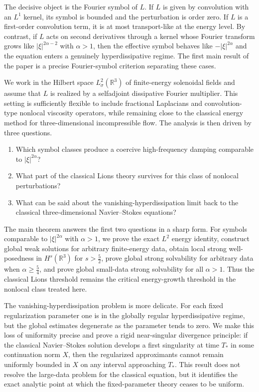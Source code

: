 \documentclass[11pt]{article}
\theoremstyle{definition}
\theoremstyle{remark}
\newcommand{\R}{\mathbb{R}}
\begin{document}
The decisive object is the Fourier symbol of $L$. If $L$ is given by convolution with an $L^1$ kernel, its symbol is bounded and the perturbation is order zero. If $L$ is a first-order convolution term, it is at most transport-like at the energy level. By contrast, if $L$ acts on second derivatives through a kernel whose Fourier transform grows like $|\xi|^{2\alpha-2}$ with $\alpha>1$, then the effective symbol behaves like $-|\xi|^{2\alpha}$ and the equation enters a genuinely hyperdissipative regime. The first main result of the paper is a precise Fourier-symbol criterion separating these cases.

We work in the Hilbert space $L^2_\sigma(\R^3)$ of finite-energy solenoidal fields and assume that $L$ is realized by a selfadjoint dissipative Fourier multiplier. This setting is sufficiently flexible to include fractional Laplacians and convolution-type nonlocal viscosity operators, while remaining close to the classical energy method for three-dimensional incompressible flow. The analysis is then driven by three questions.

\begin{enumerate}[label=(\roman*)]
\item Which symbol classes produce a coercive high-frequency damping comparable to $|\xi|^{2\alpha}$?
\item What part of the classical Lions theory survives for this class of nonlocal perturbations?
\item What can be said about the vanishing-hyperdissipation limit back to the classical three-dimensional Navier--Stokes equations?
\end{enumerate}

The main theorem answers the first two questions in a sharp form. For symbols comparable to $|\xi|^{2\alpha}$ with $\alpha>1$, we prove the exact $L^2$ energy identity, construct global weak solutions for arbitrary finite-energy data, obtain local strong well-posedness in $H^s(\R^3)$ for $s>\frac52$, prove global strong solvability for arbitrary data when $\alpha\ge\frac54$, and prove global small-data strong solvability for all $\alpha>1$. Thus the classical Lions threshold remains the critical energy-growth threshold in the nonlocal class treated here.

The vanishing-hyperdissipation problem is more delicate. For each fixed regularization parameter one is in the globally regular hyperdissipative regime, but the global estimates degenerate as the parameter tends to zero. We make this loss of uniformity precise and prove a rigid near-singular divergence principle: if the classical Navier--Stokes solution develops a first singularity at time $T_*$ in some continuation norm $X$, then the regularized approximants cannot remain uniformly bounded in $X$ on any interval approaching $T_*$. This result does not resolve the large-data problem for the classical equation, but it identifies the exact analytic point at which the fixed-parameter theory ceases to be uniform.
\end{document}
